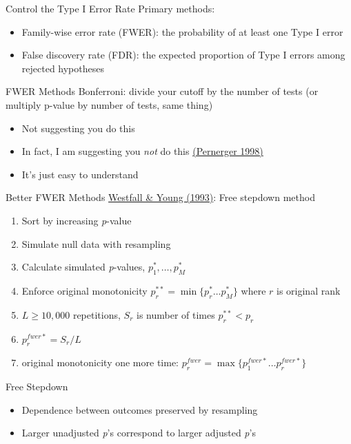 \documentclass{beamer}
\begin{document}
\begin{frame}{Control the Type I Error Rate}
Primary methods:
\begin{itemize}
\item Family-wise error rate (FWER): the probability of at least one Type I error
\item False discovery rate (FDR): the expected proportion of Type I errors among rejected hypotheses
\end{itemize}
\end{frame}

\begin{frame}{FWER Methods}
Bonferroni: divide your cutoff by the number of tests (or multiply p-value by number of tests, same thing)
\begin{itemize}
\item Not suggesting you do this
\item In fact, I am suggesting you \textit{not} do this 
\href{https://www.ncbi.nlm.nih.gov/pmc/articles/PMC1112991/}{(Pernerger 1998)}
\item It's just easy to understand
\end{itemize}
\end{frame}

\begin{frame}{Better FWER Methods}
\href{http://www.jstor.org/stable/2532216}{Westfall \& Young (1993)}: Free stepdown method
\begin{enumerate}
\item Sort by increasing \textit{p}-value
\item Simulate null data with resampling
\item Calculate simulated \textit{p}-values, $p^*_1, \ldots ,p^*_M$
\item Enforce original monotonicity $p^{**}_r=\min \{p^*_r \ldots p^*_M\}$ where $r$ is original rank
\item $L \geq 10,000$ repetitions, $S_r$ is number of times $p^{**}_r  < p_r$
\item $p_r^{fwer*}=S_r/L$
\item original monotonicity one more time: $p_r^{fwer}=\max \{p_1^{fwer*} \ldots p_r^{fwer*} \}$
\end{enumerate}
\end{frame}

\begin{frame}[label=FWERmain]{Free Stepdown}
\begin{itemize}
\item Dependence between outcomes preserved by resampling
\item Larger unadjusted \textit{p}'s correspond to larger adjusted \textit{p}'s
\end{itemize}
\hyperlink{FWERex}{}

\end{frame}
\end{document}
